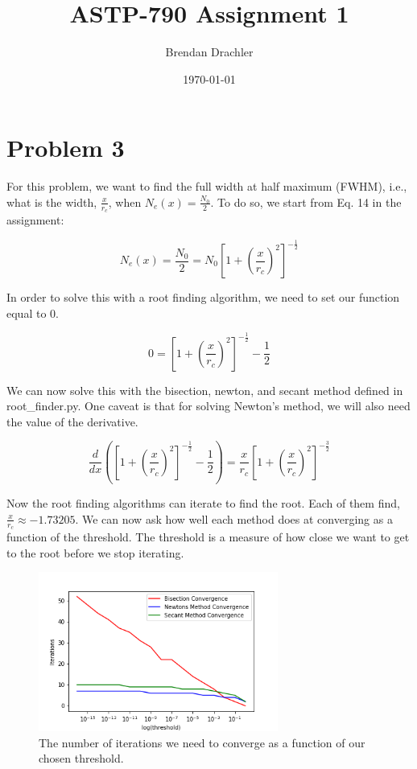 \documentclass[12pt, letterpaper]{article}
\title{ASTP-790 Assignment 1}
\author{Brendan Drachler}
\date{\today}
\begin{document}
\maketitle
\section*{Problem 3}
For this problem, we want to find the full width at half maximum (FWHM), i.e., what is the width, $\frac{x}{r_c}$, when $N_e(x) = \frac{N_0}{2}$. To do so, we start from Eq. 14 in the assignment:

\begin{equation}
N_e(x) = \frac{N_0}{2} = N_0 [1 + (\frac{x}{r_c})^2 ]^{-\frac{1}{2}}
\end{equation}

In order to solve this with a root finding algorithm, we need to set our function equal to $0$. 

\begin{equation}
0 = [1 + (\frac{x}{r_c})^2 ]^{-\frac{1}{2}} - \frac{1}{2}
\end{equation}

We can now solve this with the bisection, newton, and secant method defined in root\_finder.py. One caveat is that for solving Newton's method, we will also need the value of the derivative. 

\begin{equation}
\frac{d}{dx} ([1 + (\frac{x}{r_c})^2 ]^{-\frac{1}{2}} - \frac{1}{2}) = \frac{x}{r_c} [1 + (\frac{x}{r_c})^2 ]^{-\frac{3}{2}} 
\end{equation}

Now the root finding algorithms can iterate to find the root. Each of them find, $\frac{x}{r_c} \approx -1.73205$. We can now ask how well each method does at converging as a function of the threshold. The threshold is a measure of how close we want to get to the root before we stop iterating. 

\begin{figure}[h]
\caption{The number of iterations we need to converge as a function of our chosen threshold.}
\centering
\includegraphics[width=0.7\textwidth]{threshold_vs_iterations}
\end{figure}
\end{document}
